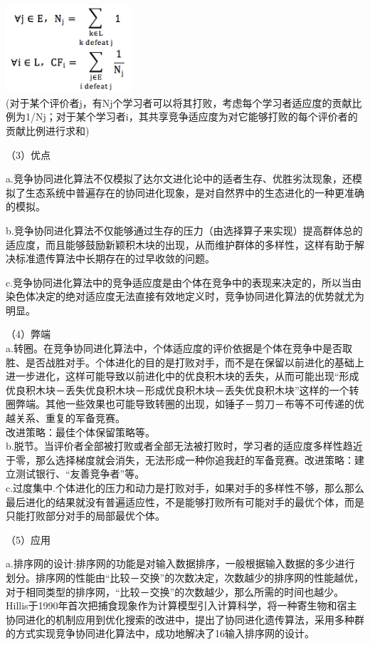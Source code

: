 \documentclass[8pt]{article}
\begin{document}
\begin{description}
      \includegraphics[width=0.35\textwidth]{11.png}    \\
      (对于某个评价者j，有Nj个学习者可以将其打败，考虑每个学习者适应度的贡献比例为1/Nj；对于某个学习者i，其共享竞争适应度为对它能够打败的每个评价者的贡献比例进行求和)    
        \item（3）优点
        \item a.竞争协同进化算法不仅模拟了达尔文进化论中的适者生存、优胜劣汰现象，还模拟了生态系统中普遍存在的协同进化现象，是对自然界中的生态进化的一种更准确的模拟。
        \item b.竞争协同进化算法不仅能够通过生存的压力（由选择算子来实现）提高群体总的适应度，而且能够鼓励新颖积木块的出现，从而维护群体的多样性，这样有助于解决标准遗传算法中长期存在的过早收敛的问题。   
        \item c.竞争协同进化算法中的竞争适应度是由个体在竞争中的表现来决定的，所以当由染色体决定的绝对适应度无法直接有效地定义时，竞争协同进化算法的优势就尤为明显。        
        \item（4）弊端\\
       a.转圈。在竞争协同进化算法中，个体适应度的评价依据是个体在竞争中是否取胜、是否战胜对手。个体进化的目的是打败对手，而不是在保留以前进化的基础上进一步进化，这样可能导致以前进化中的优良积木块的丢失，从而可能出现“形成优良积木块－丢失优良积木块－形成优良积木块－丢失优良积木块”这样的一个转圈弊端。其他一些效果也可能导致转圈的出现，如锤子－剪刀－布等不可传递的优越关系、重复的军备竞赛。\\
改进策略：最佳个体保留策略等。\\
       b.脱节。当评价者全部被打败或者全部无法被打败时，学习者的适应度多样性趋近于零，那么选择梯度就会消失，无法形成一种你追我赶的军备竞赛。改进策略：建立测试银行、“友善竞争者”等。\\
       c.过度集中.个体进化的压力和动力是打败对手，如果对手的多样性不够，那么那么最后进化的结果就没有普遍适应性，不是能够打败所有可能对手的最优个体，而是只能打败部分对手的局部最优个体。\\        
        \item（5）应用\\
        \item a.排序网的设计:排序网的功能是对输入数据排序，一般根据输入数据的多少进行划分。排序网的性能由“比较－交换”的次数决定，次数越少的排序网的性能越优，对于相同类型的排序网，“比较－交换”的次数越少，那么所需的时间也越少。Hillis于1990年首次把捕食现象作为计算模型引入计算科学，将一种寄生物和宿主协同进化的机制应用到优化搜索的改进中，提出了协同进化遗传算法，采用多种群的方式实现竞争协同进化算法中，成功地解决了16输入排序网的设计。        

\end{description}
\end{document}
